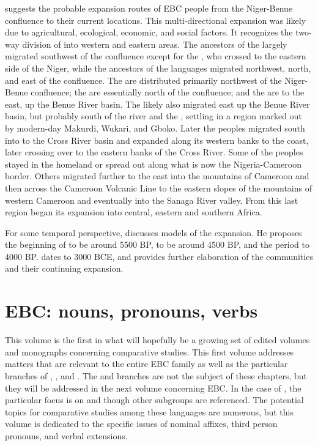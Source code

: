 \documentclass[output=paper]{langsci/langscibook}
\begin{document}
 suggests the probable expansion routes of EBC people from the Niger-Benue confluence to their current locations. This multi-directional expansion was likely due to agricultural, ecological, economic, and social factors. It recognizes the two-way division of  into western and eastern areas. The ancestors of the  largely migrated southwest of the confluence except for the , who crossed to the eastern side of the Niger, while the ancestors of the  languages migrated northwest, north, and east of the confluence.  The  are distributed primarily northwest of the Niger-Benue confluence; the  are essentially north of the confluence; and the  are to the east, up the Benue River basin. The  likely also migrated east up the Benue  River basin, but probably south of the river and the , settling in a region marked out by modern-day Makurdi, Wukari, and Gboko. Later the  peoples migrated south into to the Cross River basin and expanded along its western banks to the  coast, later crossing over to the eastern banks of the Cross River. Some of the  peoples stayed in the  homeland or spread out along what is now the Nigeria-Cameroon border. Others migrated further to the east into the mountains of Cameroon and then across the Cameroon Volcanic Line to the eastern slopes of the mountains of western Cameroon and eventually into the Sanaga River valley. From this last region  began its expansion into central, eastern and southern Africa. 

For some temporal perspective, \citet[126-138]{Blench2006} discusses models of the  expansion. He proposes the beginning of  to be around 5500 BP,  to be around 4500 BP, and the  period to 4000 BP. \citet[106-116]{Ehret2016} dates  to 3000 BCE, and provides further elaboration of the  communities and their continuing expansion.


\section{EBC: nouns, pronouns, verbs}\label{sec:watters:4}
This volume is the first in what will hopefully be a growing set of edited volumes and monographs concerning  comparative studies. This first volume addresses matters that are relevant to the entire EBC family as well as the particular branches of , , and . The  and  branches are not the subject of these chapters, but they will be addressed in the next volume concerning EBC. In the case of , the particular focus is on  and  though other  subgroups are referenced. The potential topics for comparative studies among these languages are numerous, but this volume is dedicated to the specific issues of nominal affixes, third person pronouns, and verbal extensions.
\end{document}

